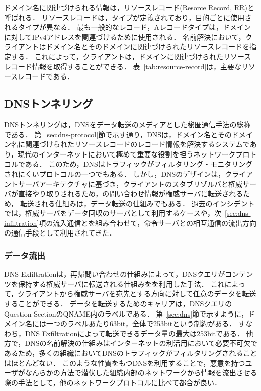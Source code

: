 

ドメイン名に関連づけられる情報は，リソースレコード(Resorce Record, RR)と呼ばれる．
リソースレコードは，タイプが定義されており，目的ごとに使用されるタイプが異なる．
最も一般的なレコード，Aレコードタイプは，ドメインに対してIPv4アドレスを関連づけるために使用される．
名前解決において，クライアントはドメイン名とそのドメインに関連づけられたリソースレコードを指定する．
これによって，クライアントは，ドメインに関連づけられたリソースレコード情報を取得することができる．
表~\ref{tab:resource-record}は，主要なリソースレコードである．




\subsection{DNSトンネリング}
DNSトンネリングは，DNSをデータ転送のメディアとした秘匿通信手法の総称である．
第~\ref{sec:dns-protocol}節で示す通り，DNSは，ドメイン名とそのドメイン名に関連づけられたリソースレコードのレコード情報を解決するシステムであり，現代のインターネットにおいて極めて重要な役割を担うネットワークプロトコルである．
このため，DNSはトラフィックがフィルタリング・モニタリングされにくいプロトコルの一つでもある．
しかし，DNSのデザインは，クライアントサーバアーキテクチャに基づき，クライアントのスタブリゾルバと権威サーバが直接やり取りされるため，の問い合わせ情報が権威サーバに転送されるため，
転送される仕組みは，データ転送の仕組みでもある．
過去のインシデントでは，権威サーバをデータ回収のサーバとして利用するケースや，次~\ref{sec:dns-infiltration}項の流入通信とを組み合わせて，命令サーバとの相互通信の流出方向の通信手段として利用されてきた．
\subsubsection{データ流出}
\label{sec:dns-exfiltration}
DNS Exfiltrationは，再帰問い合わせの仕組みによって，DNSクエリがコンテンツを保持する権威サーバに転送される仕組みをを利用した手法．
これによって，クライアントから権威サーバを宛先とする方向に対して任意のデータを転送することができる．
データを転送するためのキャリアは，DNSクエリのQuestion SectionのQNAME内のラベルである．
第~\ref{sec:dns}節で示すように，ドメイン名には一つのラベルあたり63bit，全体で253bitという制約がある．
すなわち，DNS Exfiltrationによって転送できるデータ量の最大は253bitである．
他方で，DNSの名前解決の仕組みはインターネットの利活用において必要不可欠であるため，多くの組織においてDNSのトラフィックがフィルタリングされることはほとんどない．
このような性質をもつDNSを利用することで，悪意を持つユーザがなんらかの方法で潜伏した組織内部のネットワークから情報を流出させる際の手法として，他のネットワークプロトコルに比べて都合が良い．

